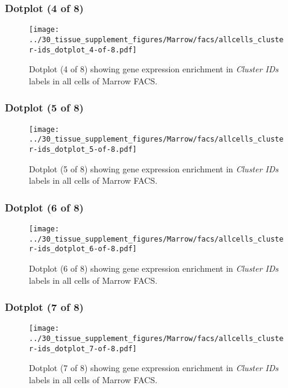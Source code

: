 \clearpage

\subsubsection{Dotplot (4 of 8)}
\begin{figure}[h]
\centering
\texttt{[image: ../30\_tissue\_supplement\_figures/Marrow/facs/allcells\_cluster-ids\_dotplot\_4-of-8.pdf]}

\caption{ Dotplot (4 of 8)  showing gene expression enrichment in \emph{Cluster IDs} labels in all cells of Marrow FACS. }
\end{figure}


\clearpage

\subsubsection{Dotplot (5 of 8)}
\begin{figure}[h]
\centering
\texttt{[image: ../30\_tissue\_supplement\_figures/Marrow/facs/allcells\_cluster-ids\_dotplot\_5-of-8.pdf]}

\caption{ Dotplot (5 of 8)  showing gene expression enrichment in \emph{Cluster IDs} labels in all cells of Marrow FACS. }
\end{figure}


\clearpage

\subsubsection{Dotplot (6 of 8)}
\begin{figure}[h]
\centering
\texttt{[image: ../30\_tissue\_supplement\_figures/Marrow/facs/allcells\_cluster-ids\_dotplot\_6-of-8.pdf]}

\caption{ Dotplot (6 of 8)  showing gene expression enrichment in \emph{Cluster IDs} labels in all cells of Marrow FACS. }
\end{figure}


\clearpage

\subsubsection{Dotplot (7 of 8)}
\begin{figure}[h]
\centering
\texttt{[image: ../30\_tissue\_supplement\_figures/Marrow/facs/allcells\_cluster-ids\_dotplot\_7-of-8.pdf]}

\caption{ Dotplot (7 of 8)  showing gene expression enrichment in \emph{Cluster IDs} labels in all cells of Marrow FACS. }
\end{figure}


